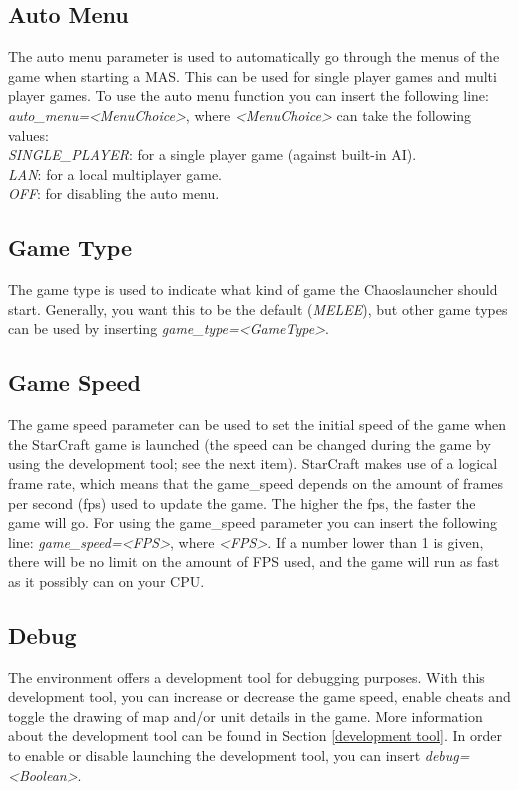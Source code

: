 \subsection{Auto Menu}
\label{auto menu}
The auto menu parameter is used to automatically go through the menus of the game when starting a MAS. This can be used for single player games and multi player games. To use the auto menu function you can insert the following line: \textit{auto\_menu=<MenuChoice>}, where \textit{<MenuChoice>} can take the following values:\\
\textit{SINGLE\_PLAYER}: for a single player game (against built-in AI).\\
\textit{LAN}: for a local multiplayer game.\\
\textit{OFF}: for disabling the auto menu.

\subsection{Game Type}
\label{game type}
The game type is used to indicate what kind of game the Chaoslauncher should start. Generally, you want this to be the default (\textit{MELEE}), but other game types can be used by inserting \textit{game\_type=<GameType>}.

\subsection{Game Speed}
\label{game speed}
The game speed parameter can be used to set the initial speed of the game when the StarCraft game is launched (the speed can be changed during the game by using the development tool; see the next item). StarCraft makes use of a logical frame rate, which means that the game\_speed depends on the amount of frames per second (fps) used to update the game. The higher the fps, the faster the game will go. For using the game\_speed parameter you can insert the following line: \textit{game\_speed=<FPS>}, where \textit{<FPS>}. If a number lower than 1 is given, there will be no limit on the amount of FPS used, and the game will run as fast as it possibly can on your CPU.

\pagebreak
\subsection{Debug}
\label{debug}
The environment offers a development tool for debugging purposes. With this development tool, you can increase or decrease the game speed, enable cheats and toggle the drawing of map and/or unit details in the game. More information about the development tool can be found in Section \ref{development tool}. In order to enable or disable launching the development tool, you can insert \textit{debug=<Boolean>}.

